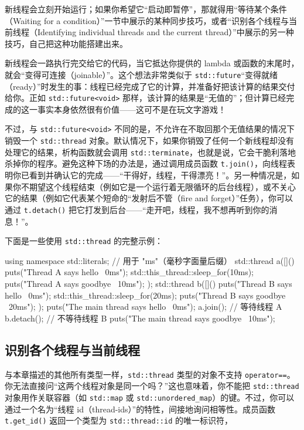 新线程会立刻开始运行；如果你希望它“启动即暂停”，那就得用“等待某个条件（Waiting for a condition）”一节中展示的某种同步技巧，或者“识别各个线程与当前线程（Identifying individual threads and the current thread）”中展示的另一种技巧，自己把这种功能搭建出来。

新线程会一路执行完交给它的代码，当它抵达你提供的 lambda 或函数的末尾时，就会“变得可连接（joinable）”。这个想法非常类似于 \texttt{std::\allowbreak{}future}“变得就绪（ready）”时发生的事：线程已经完成了它的计算，并准备好把该计算的结果交付给你。正如 \texttt{std::\allowbreak{}future<\allowbreak{}void>\allowbreak{}} 那样，该计算的结果是“无值的”；但计算已经完成的这一事实本身依然很有价值——这可不是在玩文字游戏！

不过，与 \texttt{std::\allowbreak{}future<\allowbreak{}void>\allowbreak{}} 不同的是，不允许在不取回那个无值结果的情况下销毁一个 \texttt{std::\allowbreak{}thread} 对象。默认情况下，如果你销毁了任何一个新线程却没有处理它的结果，析构函数就会调用 \texttt{std::\allowbreak{}terminate}，也就是说，它会干脆利落地杀掉你的程序。避免这种下场的办法是，通过调用成员函数 \texttt{t.\allowbreak{}join(\allowbreak{})\allowbreak{}}，向线程表明你已看到并确认它的完成——“干得好，线程，干得漂亮！”。另一种情况是，如果你不期望这个线程结束（例如它是一个运行着无限循环的后台线程），或不关心它的结果（例如它代表某个短命的“发射后不管（fire and forget）”任务），你可以通过 \texttt{t.\allowbreak{}detach(\allowbreak{})\allowbreak{}} 把它打发到后台——“走开吧，线程，我不想再听到你的消息！”。

下面是一些使用 \texttt{std::\allowbreak{}thread} 的完整示例：

\begin{codebox}[cpp]
    using namespace std::literals; // 用于 "ms"（毫秒字面量后缀）
    std::thread a([](){
      puts("Thread A says hello ~0ms");
      std::this_thread::sleep_for(10ms);
      puts("Thread A says goodbye ~10ms");
    });
    std::thread b([](){
      puts("Thread B says hello ~0ms");
      std::this_thread::sleep_for(20ms);
      puts("Thread B says goodbye ~20ms");
    });
    puts("The main thread says hello ~0ms");
    a.join(); // 等待线程 A
    b.detach(); // 不等待线程 B
    puts("The main thread says goodbye ~10ms");
\end{codebox}

\subsection{识别各个线程与当前线程}

与本章描述的其他所有类型一样，\texttt{std::\allowbreak{}thread} 类型的对象不支持 \texttt{operator==}。你无法直接问“这两个线程对象是同一个吗？”这也意味着，你不能把 \texttt{std::\allowbreak{}thread} 对象用作关联容器（如 \texttt{std::\allowbreak{}map} 或 \texttt{std::\allowbreak{}unordered\_\allowbreak{}map}）的键。不过，你可以通过一个名为“线程 id（thread-ids）”的特性，间接地询问相等性。成员函数 \texttt{t.\allowbreak{}get\_\allowbreak{}id(\allowbreak{})\allowbreak{}} 返回一个类型为 \texttt{std::\allowbreak{}thread::\allowbreak{}id} 的唯一标识符，

